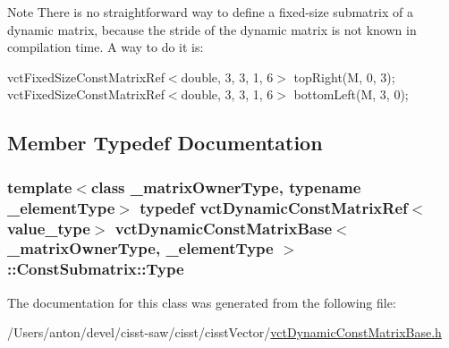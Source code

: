 \begin{DoxyNote}{Note}
There is no straightforward way to define a fixed-\/size submatrix of a dynamic matrix, because the stride of the dynamic matrix is not known in compilation time. A way to do it is\+:
\end{DoxyNote}
vct\+Fixed\+Size\+Const\+Matrix\+Ref$<$double, 3, 3, 1, 6$>$ top\+Right(\+M, 0, 3); vct\+Fixed\+Size\+Const\+Matrix\+Ref$<$double, 3, 3, 1, 6$>$ bottom\+Left(\+M, 3, 0); 

\subsection{Member Typedef Documentation}
\hypertarget{classvct_dynamic_const_matrix_base_1_1_const_submatrix_afbad836196476a7943c76d9a4fc69e28}{}
\subsubsection[{Type}]{\setlength{\rightskip}{0pt plus 5cm}template$<$class \+\_\+matrix\+Owner\+Type, typename \+\_\+element\+Type$>$ typedef {\bf vct\+Dynamic\+Const\+Matrix\+Ref}$<$value\+\_\+type$>$ {\bf vct\+Dynamic\+Const\+Matrix\+Base}$<$ \+\_\+matrix\+Owner\+Type, \+\_\+element\+Type $>$\+::{\bf Const\+Submatrix\+::\+Type}}\label{classvct_dynamic_const_matrix_base_1_1_const_submatrix_afbad836196476a7943c76d9a4fc69e28}


The documentation for this class was generated from the following file\+:\begin{DoxyCompactItemize}
\item 
/\+Users/anton/devel/cisst-\/saw/cisst/cisst\+Vector/\hyperlink{vct_dynamic_const_matrix_base_8h}{vct\+Dynamic\+Const\+Matrix\+Base.\+h}\end{DoxyCompactItemize}
